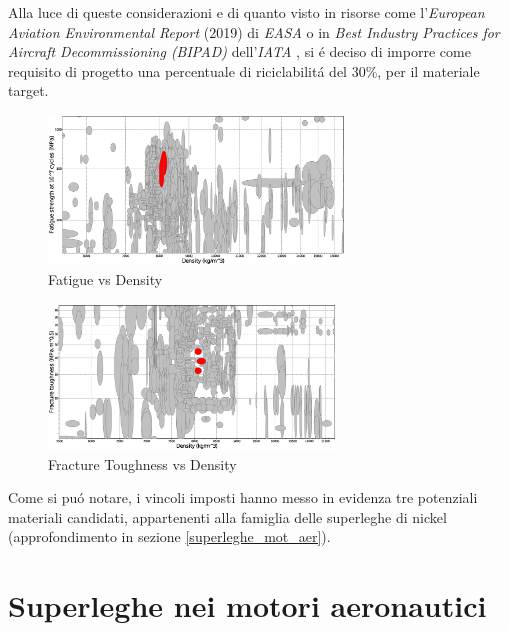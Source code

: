 \documentclass{article}
\begin{document}
    Alla luce di queste considerazioni e di quanto visto in risorse come l'\textit{European Aviation Environmental Report} (2019)
    di \textit{EASA} \autocite{EASA_environ_report_2019} o in \textit{Best Industry Practices for Aircraft Decommissioning (BIPAD)}
    dell'\textit{IATA} \autocite{IATA_aircraft_decomm}, si é deciso di imporre come requisito di progetto 
    una percentuale di riciclabilitá del 30\%, per il materiale target.

    \begin{figure}[h!]
        \centering
        \label{fig:fatigue_vs_density}
        \includegraphics[width=0.70\textwidth]{fatigue.eps} 
        \caption{Fatigue vs Density}       
    \end{figure}

    \begin{figure}[h!]
        \centering
        \label{fig:fatigue_vs_density}
        \includegraphics[width=0.68\textwidth]{fracture_toughness.eps} 
        \caption{Fracture Toughness vs Density}       
    \end{figure}

    Come si puó notare, i vincoli imposti hanno messo in evidenza tre potenziali materiali candidati, appartenenti
    alla famiglia delle superleghe di nickel (approfondimento in sezione \ref{superleghe_mot_aer}).



    \clearpage 

    \section{Superleghe nei motori aeronautici\label{superleghe_mot_aer}}
  
\end{document}
